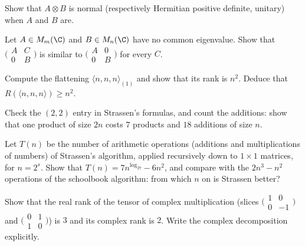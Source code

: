 \begin{exercise}[$\star$]\label{linear:ex:kronnormal}
Show that $A\otimes B$ is normal (respectively Hermitian positive definite, unitary) when $A$ and $B$ are.
\end{exercise}

\begin{exercise}[$\star\star$]\label{linear:ex:roth}
Let $A\in M_m(\C)$ and $B\in M_n(\C)$ have no common eigenvalue. Show that $\bigl(\begin{smallmatrix}A&C\\0&B\end{smallmatrix}\bigr)$ is similar to
$\bigl(\begin{smallmatrix}A&0\\0&B\end{smallmatrix}\bigr)$ for every $C$.
\end{exercise}

\begin{exercise}[$\star$]\label{linear:ex:flattening}
Compute the flattening $\langle n,n,n\rangle_{(1)}$ and show that its rank is $n^2$. Deduce that $R(\langle n,n,n\rangle)\ge n^2$.
\end{exercise}

\begin{exercise}[$\star$]\label{linear:ex:strassen22}
Check the $(2,2)$ entry in Strassen's formulas, and count the additions: show that one product of size $2n$ costs $7$ products and
$18$ additions of size $n$.
\end{exercise}

\begin{exercise}[$\star\star$]\label{linear:ex:strassencount}
Let $T(n)$ be the number of arithmetic operations (additions and multiplications of numbers) of Strassen's algorithm, applied
recursively down to $1\times1$ matrices, for $n=2^s$. Show that $T(n)=7n^{\log_27}-6n^2$, and compare with the $2n^3-n^2$ operations of
the schoolbook algorithm: from which $n$ on is Strassen better?
\end{exercise}

\begin{exercise}[$\star\star$]\label{linear:ex:complexmult}
Show that the real rank of the tensor of complex multiplication (slices $\bigl(\begin{smallmatrix}1&0\\0&-1\end{smallmatrix}\bigr)$ and
$\bigl(\begin{smallmatrix}0&1\\1&0\end{smallmatrix}\bigr)$) is $3$ and its complex rank is $2$. Write the complex decomposition explicitly.
\end{exercise}

